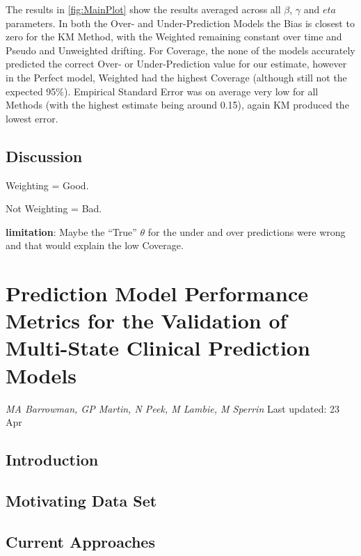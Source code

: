 \documentclass[12pt,PhD,twoside,openright]{muthesis}
\begin{document}
The results in \ref{fig:MainPlot} show the results averaged across all \(\beta\), \(\gamma\) and \(eta\) parameters. In both the Over- and Under-Prediction Models the Bias is closest to zero for the KM Method, with the Weighted remaining constant over time and Pseudo and Unweighted drifting. For Coverage, the none of the models accurately predicted the correct Over- or Under-Prediction value for our estimate, however in the Perfect model, Weighted had the highest Coverage (although still not the expected 95\%). Empirical Standard Error was on average very low for all Methods (with the highest estimate being around 0.15), again KM produced the lowest error.

\hypertarget{discussion-2}{%
\section{Discussion}\label{discussion-2}}

Weighting = Good.

Not Weighting = Bad.

\textbf{limitation}: Maybe the ``True'' \(\theta\) for the under and over predictions were wrong and that would explain the low Coverage.

\hypertarget{chap-performance-metrics}{%
\chapter{Prediction Model Performance Metrics for the Validation of Multi-State Clinical Prediction Models}\label{chap-performance-metrics}}

\emph{MA Barrowman, GP Martin, N Peek, M Lambie, M Sperrin}
Last updated: 23 Apr

\hypertarget{introduction-5}{%
\section{Introduction}\label{introduction-5}}

\hypertarget{motivating-data-set}{%
\section{Motivating Data Set}\label{motivating-data-set}}

\hypertarget{current-approaches}{%
\section{Current Approaches}\label{current-approaches}}
\end{document}
